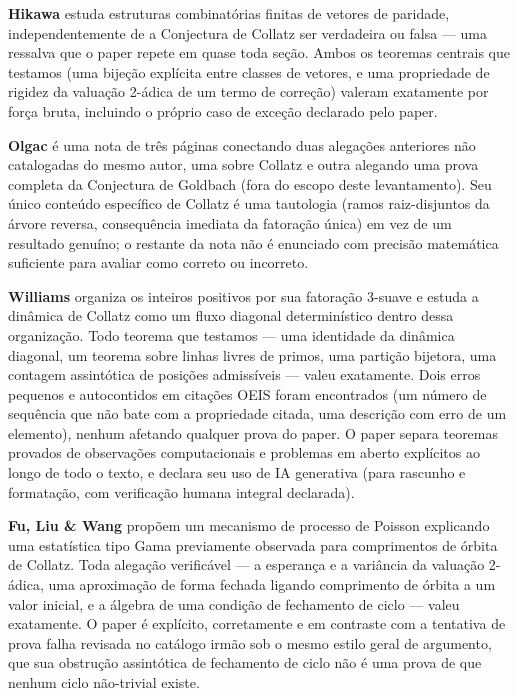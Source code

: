 \documentclass[11pt]{article}
\begin{document}
\textbf{Hikawa} \cite{Hikawa2026} estuda estruturas combinatórias
finitas de vetores de paridade, independentemente de a Conjectura de
Collatz ser verdadeira ou falsa --- uma ressalva que o paper repete em
quase toda seção. Ambos os teoremas centrais que testamos (uma bijeção
explícita entre classes de vetores, e uma propriedade de rigidez da
valuação 2-ádica de um termo de correção) valeram exatamente por força
bruta, incluindo o próprio caso de exceção declarado pelo paper.

\textbf{Olgac} \cite{Olgac2026} é uma nota de três páginas conectando
duas alegações anteriores não catalogadas do mesmo autor, uma sobre
Collatz e outra alegando uma prova completa da Conjectura de Goldbach
(fora do escopo deste levantamento). Seu único conteúdo específico de
Collatz é uma tautologia (ramos raiz-disjuntos da árvore reversa,
consequência imediata da fatoração única) em vez de um resultado
genuíno; o restante da nota não é enunciado com precisão matemática
suficiente para avaliar como correto ou incorreto.

\textbf{Williams} \cite{Williams2026} organiza os inteiros positivos por
sua fatoração 3-suave e estuda a dinâmica de Collatz como um fluxo
diagonal determinístico dentro dessa organização. Todo teorema que
testamos --- uma identidade da dinâmica diagonal, um teorema sobre
linhas livres de primos, uma partição bijetora, uma contagem
assintótica de posições admissíveis --- valeu exatamente. Dois erros
pequenos e autocontidos em citações OEIS foram encontrados (um número
de sequência que não bate com a propriedade citada, uma descrição
com erro de um elemento), nenhum afetando qualquer prova do paper. O
paper separa teoremas provados de observações computacionais e
problemas em aberto explícitos ao longo de todo o texto, e declara seu
uso de IA generativa (para rascunho e formatação, com verificação
humana integral declarada).

\textbf{Fu, Liu \& Wang} \cite{FuLiuWang2026} propõem um mecanismo de
processo de Poisson explicando uma estatística tipo Gama previamente
observada para comprimentos de órbita de Collatz. Toda alegação
verificável --- a esperança e a variância da valuação 2-ádica, uma
aproximação de forma fechada ligando comprimento de órbita a um valor
inicial, e a álgebra de uma condição de fechamento de ciclo --- valeu
exatamente. O paper é explícito, corretamente e em contraste com a
tentativa de prova falha revisada no catálogo irmão sob o mesmo estilo
geral de argumento, que sua obstrução assintótica de fechamento de
ciclo não é uma prova de que nenhum ciclo não-trivial existe.
\end{document}
